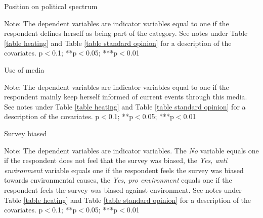 \documentclass{article}
\begin{document}
\begin{landscape}
	\begin{table}[h!]
	\caption{Position on political spectrum}
	\begin{center}
		\scalebox{0.6}{}
	\end{center}
	{\footnotesize Note: The dependent variables are indicator variables equal to one if the respondent defines herself as being part of the category. See notes under Table \ref{table heating} and Table \ref{table standard opinion} for a description of the covariates.
	\newline *p$<$0.1; **p$<$0.05; ***p$<$0.01}
\end{table}	
\end{landscape}


\begin{table}[h!]
	\caption{Use of media}
	\begin{center}
		\scalebox{0.7}{}
	\end{center}
	{\footnotesize Note: The dependent variables are indicator variables equal to one if the respondent mainly keep herself informed of current events through this media. See notes under Table \ref{table heating} and Table \ref{table standard opinion} for a description of the covariates.
	\newline *p$<$0.1; **p$<$0.05; ***p$<$0.01}
\end{table}	

\begin{table}[h!]
	\caption{Survey biased}
	\begin{center}
		\scalebox{0.7}{}
	\end{center}
	{\footnotesize Note: The dependent variables are indicator variables. The \textit{No} variable equals one if the respondent does not feel that the survey was biased, the \textit{Yes, anti environment} variable equals one if the respondent feels the survey was biased towards environmental causes, the \textit{Yes, pro environment} equals one if the respondent feels the survey was biased against environment. See notes under Table \ref{table heating} and Table \ref{table standard opinion} for a description of the covariates.
	\newline *p$<$0.1; **p$<$0.05; ***p$<$0.01}
\end{table}	
\end{document}
